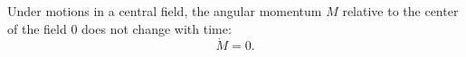 Under motions in a central field, the angular momentum $M$ relative to the center of the field $0$ does not change with time:
$$\dot{M} = 0.$$
